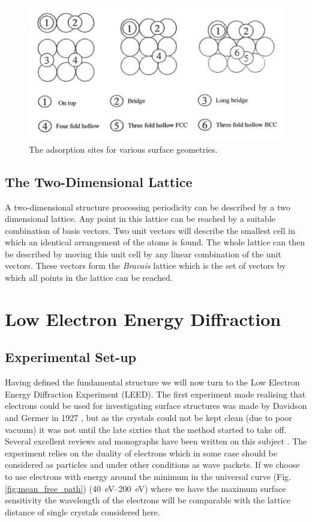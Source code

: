\begin{figure}[h!]
	\begin{center}
	\includegraphics[scale=3.5]{figures/09_04.png}
	\caption{The adsorption sites for various surface geometries.}
	\label{fig:adsorptionsites}
	\end{center}
\end{figure}

\subsection{The Two-Dimensional Lattice}
A two-dimensional structure processing periodicity can be described by a two dimensional lattice. Any point in this lattice can be reached by a suitable combination of basis vectors. Two unit vectors will describe the smallest cell in which an identical arrangement of the atoms is found. The whole lattice can then be described by moving this unit cell by any linear combination of the unit vectors. These vectors form the {\it Bravais} lattice which is the set of vectors by which all points in the lattice can be reached.

\section{Low Electron Energy Diffraction}
\subsection{Experimental Set-up}
Having defined the fundamental structure we will now turn to the Low Electron Energy Diffraction Experiment (LEED). The first experiment made realising that electrons could be used for investigating surface structures was made by Davidson and Germer in 1927 \cite{Davidson}, but as the crystals could not be kept clean (due to poor vacuum) it was not until the late sixties that the method started to take off. Several excellent reviews and monographs have been written on this subject \cite{Pendry, Hove, Heinz, Ertl}. The experiment relies on the duality of electrons which in some case should be considered as particles and under other conditions as wave packets. If we choose to use electrons with energy around the minimum in the universal curve (Fig. \ref{fig:mean_free_path}) (\SIrange{40}{200}{\electronvolt}) where we have the maximum surface sensitivity the wavelength of the electrons will be comparable with the lattice distance of single crystals considered here.

